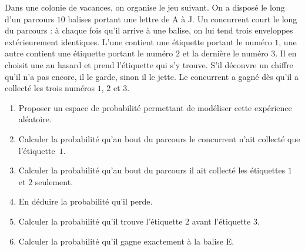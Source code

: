 \documentclass[a4paper,12pt,reqno]{amsart}
\begin{document}
\begin{exo}

  Dans une colonie de vacances, on organise le jeu suivant. On a disposé le long d'un parcours $10$ balises portant une lettre de A à J. Un concurrent court le long du parcours : à chaque fois qu'il arrive à une balise, on lui tend trois enveloppes extérieurement identiques. L'une contient une étiquette portant le numéro $1$, une autre contient une étiquette portant le numéro $2$ et la dernière le numéro $3$. Il en choisit une au hasard et prend l'étiquette qui s'y trouve. S'il découvre un chiffre qu'il n'a pas encore, il le garde, sinon il le jette. Le concurrent a gagné dès qu'il a collecté les trois numéros $1$, $2$ et $3$.

  \begin{enumerate}
    \item Proposer un espace de probabilité permettant de modéliser cette expérience aléatoire.
    \item Calculer la probabilité qu'au bout du parcours le concurrent n'ait collecté que l'étiquette~$1$.
    \item Calculer la probabilité qu'au bout du parcours il ait collecté les étiquettes $1$ et $2$ seulement.
    \item En déduire la probabilité qu'il perde.
    \item Calculer la probabilité qu'il trouve l'étiquette $2$ avant l'étiquette $3$.
    \item Calculer la probabilité qu'il gagne exactement à la balise E.
  \end{enumerate}

\end{exo}
\end{document}
